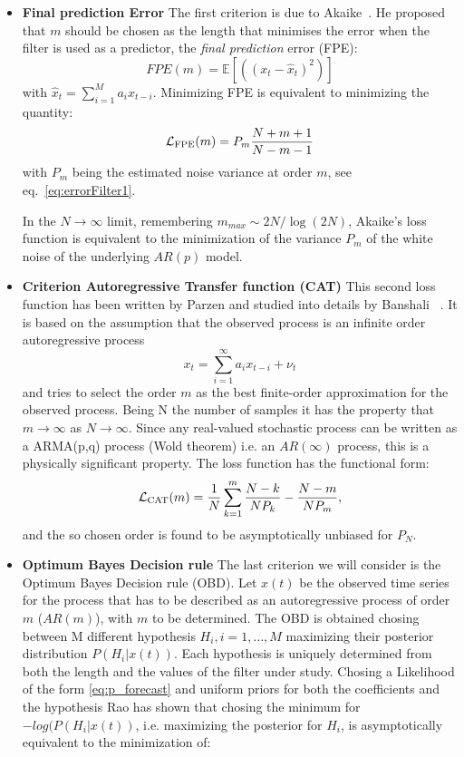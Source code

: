 \documentclass[twocolumn,showpacs,preprintnumbers,nofootinbib,prd,
superscriptaddress,10pt]{revtex4-1}
\begin{document}
\begin{itemize}
\item \textbf{Final prediction Error } 
The first criterion is due to Akaike~\cite{Akaike1970StatisticalPI}. He proposed that $m$ should be chosen as the 
length that minimises the error when the filter is used as a predictor, the \emph{final prediction} error (FPE): 
\begin{equation}
    FPE(m) = \mathbb{E}\left[ \left((x_t - \hat x_t) ^ 2\right) \right]
\end{equation}
with $\hat{x}_t = \sum_{i = 1}^M a_i x_{t - i}$.
Minimizing FPE is equivalent to minimizing the quantity: 
\begin{equation}
    \mathcal{L}_{\rm FPE}(m) = P_{m} \frac{N + m + 1}{N - m - 1}
\end{equation}
with $P_m$ being the estimated noise variance at order $m$, see eq.~\eqref{eq:errorFilter1}.

In the $N \to \infty$ limit, remembering $m_{max} \sim 2N / \log(2N)$, Akaike's loss function is equivalent to the minimization of the variance $P_m$ of the white noise of the underlying $AR(p)$ model. 

\item \textbf{Criterion Autoregressive Transfer function (CAT)}
This second loss function has been written by Parzen and studied into details by Banshali ~\cite{bhansali1986}. 
It is based on the assumption that the observed process is an infinite order autoregressive process 
\begin{equation} 
x_t = \sum_{i = 1}^{\infty}a_{i}x_{t-i} + \nu_t
\end{equation} 
and tries to select the order $m$ as the best finite-order approximation for the observed process. Being N the number of samples it has the property that $m \to \infty$ as $N \to \infty$. Since any real-valued stochastic process can be written as a ARMA(p,q) process (Wold theorem) i.e. an $AR(\infty)$ process, this is a physically significant property. 
The loss function has the functional form: 
\begin{equation}
    \mathcal{L}_{\rm CAT}(m) = \frac{1}{N}\sum_{k = 1}^m \frac{N - k}{N P_k} - \frac{N - m}{N P_m},
\end{equation}
and the so chosen order is found to be asymptotically unbiased for $P_N$. 

\item \textbf{Optimum Bayes Decision rule} 
The last criterion we will consider is the Optimum Bayes Decision rule (OBD)\cite{doi:10.1029/WR018i004p01097}. Let $x(t)$ be the observed 
time series for the process that has to be described as an autoregressive process of order $m$ ($AR(m)$), with $m$ to be determined. The OBD is obtained chosing between M different hypothesis $H_i, i = 1, \dots, M$ maximizing their posterior distribution $P(H_i\vert x(t))$. Each
hypothesis is uniquely determined from both the length and the values of the filter under study. Chosing a Likelihood of the form \eqref{eq:p_forecast} and uniform priors for both the coefficients and the hypothesis Rao has shown that chosing the minimum for $-log(P(H_i \vert x(t))$, i.e. maximizing the posterior for $H_i$, is asymptotically equivalent to the minimization of:


\end{itemize}
\end{document}
